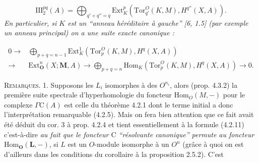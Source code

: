 \[
\tag{4.3.6}
\mathrm{III}_2^{pq}(A)=
\bigoplus_{q'+q''=q}
\mathrm{Ext}_K^p(\mathrm{Tor}_{q'}^O(K,M),H^{q''}(X,A)).
\]
\textit{En particulier, si $K$ est un \textup{``}anneau héréditaire à gauche\textup{''}
\textup{[6, 1.5] (}par exemple un anneau principal\textup{)} on a une suite exacte canonique :}

\[
\begin{split}
0\to{}&
\bigoplus_{p+q=n-1}
\mathrm{Ext}_K^1(\mathrm{Tor}_p^O(K,M),H^q(X,A))\\
\to{}&\mathrm{Ext}_{\mathbf O}^n(X;\mathbf M,A)
\to
\bigoplus_{p+q=n}
\mathrm{Hom}_K(\mathrm{Tor}_p^O(K,M),H^q(X,A))
\to0.
\end{split}
\]

\textsc{Remarques.} 1. Supposons les $L_i$ isomorphes à des
$O^{n_i}$, alors (prop. 4.3.2) la première suite spectrale d'hyperhomologie du
foncteur $\mathrm{Hom}_O(M,-)$ pour le complexe $\Gamma \mathrm C(A)$ est celle du
théorème 4.2.1 dont le terme initial a donc l'interprétation remarquable
(4.2.5). Mais on fera bien attention que ce fait avait été déduit du cor. 3 à
prop. 4.2.4 et tient essentiellement à la formule (4.2.11) c'est-à-dire
\textit{au fait que le foncteur $\mathrm C$ \textup{``}résolvante canonique\textup{''} permute au
foncteur} $\mathrm{Hom}_{\mathbf O}(\mathbf L,-)$, si $L$ est un $O$-module isomorphe à un $O^n$
(grâce à quoi on est d'ailleurs dans les conditions du corollaire à la
proposition 2.5.2). C'est

